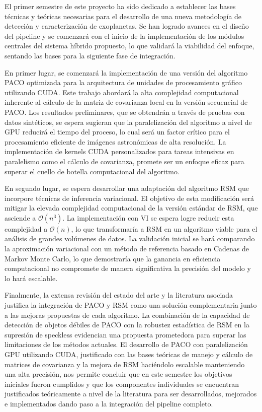 
El primer semestre de este proyecto ha sido dedicado a establecer las bases técnicas y teóricas necesarias para el desarrollo de una nueva metodología de detección y caracterización de exoplanetas. Se han logrado avances en el diseño del pipeline y se comenzará con el inicio de la implementación de los módulos centrales del sistema híbrido propuesto, lo que validará la viabilidad del enfoque, sentando las bases para la siguiente fase de integración.

En primer lugar, se comenzará la implementación de una versión del algoritmo PACO optimizada para la arquitectura de unidades de procesamiento gráfico utilizando CUDA. Este trabajo abordará la alta complejidad computacional inherente al cálculo de la matriz de covarianza local en la versión secuencial de PACO. Los resultados preliminares, que se obtendrán a través de pruebas con datos sintéticos, se espera sugieran que la paralelización del algoritmo a nivel de GPU reducirá el tiempo del proceso, lo cual será un factor crítico para el procesamiento eficiente de imágenes astronómicas de alta resolución. La implementación de kernels CUDA personalizados para tareas intensivas en paralelismo como el cálculo de covarianza, promete ser un enfoque eficaz para superar el cuello de botella computacional del algoritmo.

En segundo lugar, se espera desarrollar una adaptación del algoritmo RSM que incorpore técnicas de inferencia variacional. El objetivo de esta modificación será mitigar la elevada complejidad computacional de la versión estándar de RSM, que asciende a $\mathcal{O}(n^3)$. La implementación con VI se espera logre reducir esta complejidad a $\mathcal{O}(n)$, lo que transformaría a RSM en un algoritmo viable para el análisis de grandes volúmenes de datos. La validación inicial se hará comparando la aproximación variacional con un método de referencia basado en Cadenas de Markov Monte Carlo, lo que demostraría que la ganancia en eficiencia computacional no compromete de manera significativa la precisión del modelo y lo hará escalable.

Finalmente, la extensa revisión del estado del arte y la literatura asociada justifica la integración de PACO y RSM como una solución complementaria junto a las mejoras propuestas de cada algoritmo. La combinación de la capacidad de detección de objetos débiles de PACO con la robustez estadística de RSM en la supresión de speckless evidencian una propuesta prometedora para superar las limitaciones de los métodos actuales. El desarrollo de PACO con paralelización GPU utilizando CUDA, justificado con las bases teóricas de manejo y cálculo de matrices de covarianza y la mejora de RSM haciéndolo escalable manteniendo una alta precisión, nos permite concluir que en este semestre los objetivos iniciales fueron cumplidos y que los componentes individuales se encuentran justificados teóricamente a nivel de la literatura para ser desarrollados, mejorados e implementados dando paso a la integración del pipeline completo.



